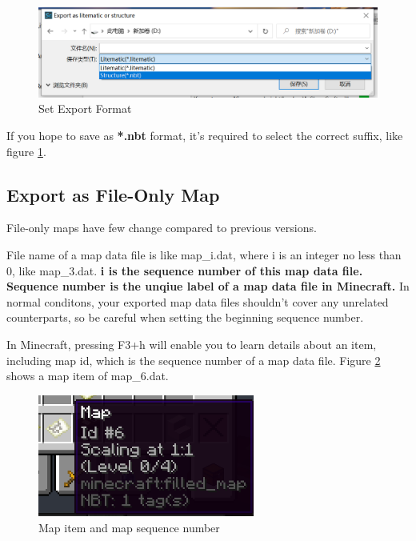 \documentclass{article}
\begin{document}
    \begin{figure}[htbp]
        \centering
        \includegraphics[width=15cm]{Img7_SelectFormat.png}
        \caption{Set Export Format}
        \label{setExport3DFormat}
    \end{figure}

    If you hope to save as \textbf{*.nbt} format, it's required to select the correct suffix, like figure \ref*{setExport3DFormat}.

    \subsection{Export as File-Only Map}
    File-only maps have few change compared to previous versions.

    File name of a map data file is like map\_i.dat, where i is an integer no less than 0, like map\_3.dat. \textbf{i is the sequence number of this map data file. Sequence number is the unqiue label of a map data file in Minecraft.} In normal conditons, your exported map data files shouldn't cover any unrelated counterparts, so be careful when setting the beginning sequence number.

    In Minecraft, pressing F3+h will enable you to learn details about an item, including map id, which is the sequence number of a map data file. Figure \ref*{mapItem} shows a map item of map\_6.dat.
   \begin{figure}[htbp]
       \centering
       \includegraphics[height=4cm]{Img8_MapItem.png}
       \caption{Map item and map sequence number}
       \label{mapItem}
   \end{figure}
\end{document}
